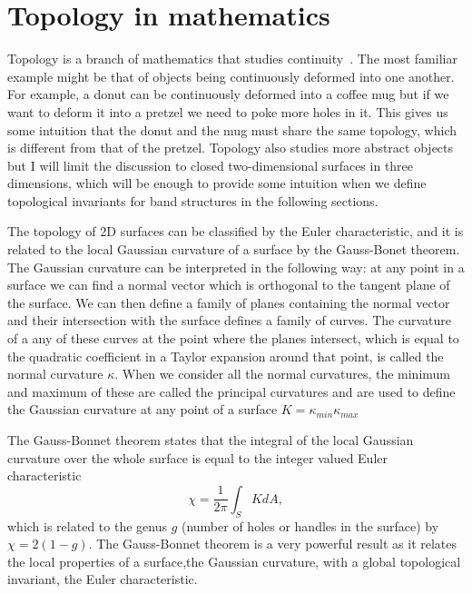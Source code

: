 \section{Topology in mathematics} 

Topology is a branch of mathematics that studies continuity~\cite{differential_topology_and_geometry}. The most familiar example might be that of objects being continuously deformed into one another. For example, a donut can be continuously deformed into a coffee mug but if we want to deform it into a pretzel we need to poke more holes in it. This gives us some intuition that the donut and the mug must share the same topology, which is different from that of the pretzel. Topology also studies more abstract objects but I will limit the discussion to closed two-dimensional surfaces in three dimensions, which will be enough to provide some intuition when we define topological invariants for band structures in the following sections.  

The topology of 2D surfaces can be classified by the Euler characteristic, and it is related to the local Gaussian curvature of a surface by the Gauss-Bonet theorem. The Gaussian curvature can be interpreted in the following way: at any point in a surface we can find a normal vector which is orthogonal to the tangent plane of the surface. We can then define a family of planes containing the normal vector and their intersection with the surface defines a family of curves. The curvature of a any of these curves at the point where the planes intersect, which is equal to the quadratic coefficient in a Taylor expansion around that point, is called the normal curvature $\kappa$. When we consider all the normal curvatures, the minimum and maximum of these are called the principal curvatures and are used to define the Gaussian curvature at any point of a surface $K=\kappa_{min}\kappa_{max}$~\cite{differential_topology_and_geometry} 

The Gauss-Bonnet theorem states that the integral of the local Gaussian curvature over the whole surface is equal to the integer valued Euler characteristic
%
\begin{equation}
	\chi = \frac{1}{2\pi}\int_S K dA,
	\label{eq:euler_characteristic}
\end{equation}
%
which is related to the genus $g$ (number of holes or handles in the surface) by $\chi=2(1-g)$. The Gauss-Bonnet theorem is a very powerful result as it relates the local properties of a surface,the Gaussian curvature, with a global topological invariant, the Euler characteristic. 


